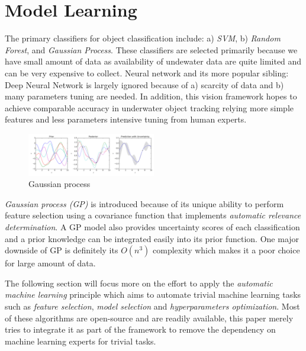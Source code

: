 \documentclass[hyp]{socreport}
\begin{document}

\chapter{Model Learning}

The primary classifiers for object classification include: a) \textit{SVM}, b)
\textit{Random Forest}, and \textit{Gaussian Process}. These classifiers are
selected primarily because we have small amount of data as availability of
undewater data are quite limited and can be very expensive to collect. Neural
network and its more popular sibling: Deep Neural Network is largely ignored
because of a) scarcity of data and b) many parameters tuning are needed. In
addition,  this vision framework hopes to achieve comparable accuracy in
underwater object tracking relying more simple features and less parameters
intensive tuning from human experts.

\begin{figure}[H]
\centering
  \includegraphics[width=0.5\textwidth, height=0.1\textheight]{gp.png}
  \caption{Gaussian process}
  \label{fig:gp}
\end{figure}

\textit{Gaussian process (GP)}  is introduced
because of its unique ability to perform feature selection using a covariance
function that implements \textit{automatic relevance determination}. A GP model
also provides uncertainty scores of each classification and a prior knowledge
can be integrated easily into its prior function. One major downside of GP is
definitely its $O(n^3)$ complexity which makes it a poor choice for large amount
of data.

The following section will focus more on the effort to apply the
\textit{automatic machine learning} principle which aims to automate trivial
machine learning tasks such as \textit{feature selection}, \textit{model
  selection} and \textit{hyperparameters optimization}. Most of these algorithms
are open-source and are readily available, this paper merely tries to integrate it
as part of the framework to remove the dependency on machine learning experts
for trivial tasks.
\end{document}
